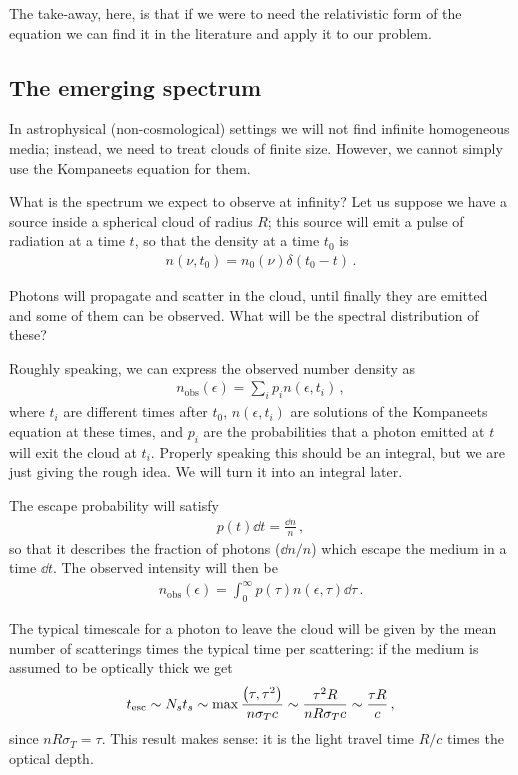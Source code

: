 \documentclass[main.tex]{subfiles}
\begin{document}
The take-away, here, is that if we were to need the relativistic form of the equation we can find it in the literature and apply it to our problem.

\subsection{The emerging spectrum}

In astrophysical (non-cosmological) settings we will not find infinite homogeneous media; instead, we need to treat clouds of finite size. 
However, we cannot simply use the Kompaneets equation for them.

What is the spectrum we expect to observe at infinity? 
Let us suppose we have a source inside a spherical cloud of radius \(R\); this source will emit a pulse of radiation at a time \(t\), so that the density at a time \(t_0 \) is 
%
\begin{align}
n(\nu , t_0 ) = n_0 (\nu ) \delta (t_0  - t )
\,.
\end{align}

Photons will propagate and scatter in the cloud, until finally they are emitted and some of them can be observed. What will be the spectral distribution of these? 

Roughly speaking, we can express the observed number density as 
%
\begin{align}
n _{\text{obs}}(\epsilon ) = \sum _{i} p_i n(\epsilon , t_i)
\,,
\end{align}
%
where \(t_i\) are different times after \(t_0 \), \(n(\epsilon, t_i)\) are solutions of the Kompaneets equation at these times, and \(p_i\) are the probabilities that a photon emitted at \(t\) will exit the cloud at \(t_i\).
Properly speaking this should be an integral, but we are just giving the rough idea. We will turn it into an integral later.

The escape probability will satisfy 
%
\begin{align}
p(t) \dd{t} = \frac{ \dd{n}}{n}
\,,
\end{align}
%
so that it describes the fraction of photons (\(\dd{n} / n\)) which escape the medium in a time \(\dd{t}\). 
The observed intensity will then be 
%
\begin{align}
n _{\text{obs}}(\epsilon ) = \int_0^{\infty } p(\tau) n(\epsilon , \tau ) \dd{\tau }
\,.
\end{align}

The typical timescale for a photon to leave the cloud will be given by the mean number of scatterings times the typical time per scattering: if the medium is assumed to be optically thick we get 
%
\begin{align}
t _{\text{esc}} \sim N_s t_s \sim \max \frac{\qty(\tau,\tau^2) }{n \sigma _T c} \sim \frac{\tau^2 R}{nR \sigma _T c} \sim \frac{\tau R}{c}
\,,
\end{align}
%
since \(n R \sigma _T = \tau \). 
This result makes sense: it is the light travel time \(R / c\) times the optical depth. 
\end{document}
